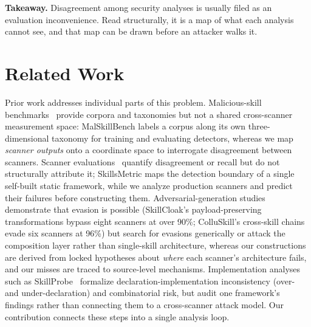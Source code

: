 \documentclass[sigconf,nonacm]{acmart}
\begin{document}
\medskip
\noindent\textbf{Takeaway.} Disagreement among security analyses is usually filed as an evaluation inconvenience. Read structurally, it is a map of what each analysis cannot see, and that map can be drawn before an attacker walks it.

\section{Related Work}
\label{sec:related}

Prior work addresses individual parts of this problem. Malicious-skill benchmarks~\cite{malskillbench2026,skilltrustbench2026} provide corpora and taxonomies but not a shared cross-scanner measurement space: MalSkillBench labels a corpus along its own three-dimensional taxonomy for training and evaluating detectors, whereas we map \emph{scanner outputs} onto a coordinate space to interrogate disagreement between scanners. Scanner evaluations~\cite{clawhub2026,locatejudge2026,skillscan2026,skillsmetric2026} quantify disagreement or recall but do not structurally attribute it; SkillsMetric maps the detection boundary of a single self-built static framework, while we analyze production scanners and predict their failures before constructing them. Adversarial-generation studies~\cite{cloakdetonate2026,colluskill2026} demonstrate that evasion is possible (SkillCloak's payload-preserving transformations bypass eight scanners at over 90\%; ColluSkill's cross-skill chains evade six scanners at 96\%) but search for evasions generically or attack the composition layer rather than single-skill architecture, whereas our constructions are derived from locked hypotheses about \emph{where} each scanner's architecture fails, and our misses are traced to source-level mechanisms. Implementation analyses such as SkillProbe~\cite{skillprobe2026} formalize declaration-implementation inconsistency (over- and under-declaration) and combinatorial risk, but audit one framework's findings rather than connecting them to a cross-scanner attack model. Our contribution connects these steps into a single analysis loop.



\end{document}
